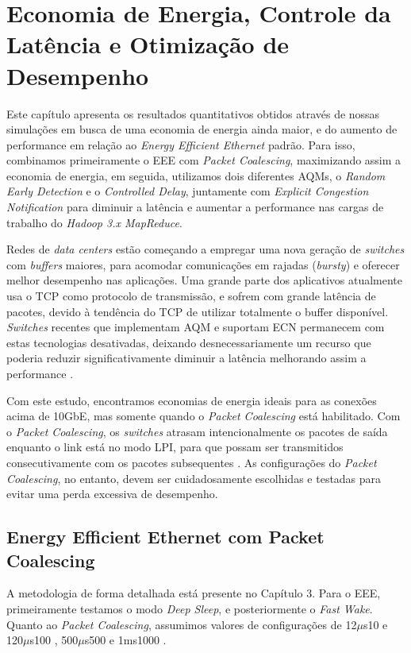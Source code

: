\chapter{Economia de Energia, Controle da Latência e Otimização de Desempenho}

Este capítulo apresenta os resultados quantitativos obtidos através de nossas simulações em busca de uma economia de energia ainda maior, e do aumento de performance em relação ao \emph{Energy Efficient Ethernet} padrão. Para isso, combinamos primeiramente o EEE com \emph{Packet Coalescing}, maximizando assim a economia de energia, em seguida, utilizamos dois diferentes AQMs, o \emph{Random Early Detection} e o \emph{Controlled Delay}, juntamente com \emph{Explicit Congestion Notification} para diminuir a latência e aumentar a performance nas cargas de trabalho do \emph{Hadoop 3.x MapReduce}.

Redes de \emph{data centers} estão começando a empregar uma nova geração de \emph{switches} com \emph{buffers} maiores, para acomodar comunicações em rajadas (\emph{bursty}) e oferecer melhor desempenho nas aplicações. Uma grande parte dos aplicativos atualmente usa o TCP como protocolo de transmissão, e sofrem com grande latência de pacotes, devido à tendência do TCP de utilizar totalmente o buffer disponível. \emph{Switches} recentes que implementam AQM e suportam ECN permanecem com estas tecnologias desativadas, deixando desnecessariamente um recurso que poderia reduzir significativamente diminuir a latência melhorando assim a performance \cite{silva2018eon}.

Com este estudo, encontramos economias de energia ideais para as conexões acima de 10GbE, mas somente quando o \emph{Packet Coalescing} está habilitado. Com o \emph{Packet Coalescing}, os \emph{switches} atrasam intencionalmente os pacotes de saída enquanto o link está no modo LPI, para que possam ser transmitidos consecutivamente com os pacotes subsequentes \cite{silva2018eon}. As configurações do \emph{Packet Coalescing}, no entanto, devem ser cuidadosamente escolhidas e testadas para evitar uma perda excessiva de desempenho.

\section{Energy Efficient Ethernet com Packet Coalescing}

A metodologia de forma detalhada está presente no Capítulo 3. Para o EEE, primeiramente testamos o modo \emph{Deep Sleep}, e posteriormente o \emph{Fast Wake}. Quanto ao \emph{Packet Coalescing}, assumimos valores de configurações de 12$\mu$s10 e 120$\mu$s100 \cite{christensen2010ieee}, 500$\mu$s500 \cite{silva2018eon} e 1ms1000 \cite{reviriego2010burst}.

